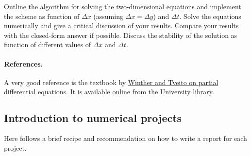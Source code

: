 \documentclass[%
oneside,                 %
final,                   %
10pt]{article}
\begin{document}
Outline the algorithm for solving the two-dimensional equations and
implement the scheme as function of $\Delta x$ (assuming $\Delta x =
\Delta y$) and $\Delta t$. Solve the equations numerically and give a
critical discussion of your results. Compare your results with the
closed-form answer if possible. Discuss the stability of the solution
as function of different values of $\Delta x$ and $\Delta t$.


\paragraph{References.}
A very good reference is the textbook by \href{{http://www.springer.com/us/book/9783540225515}}{Winther and Tveito on partial differential equations}. It is available online \href{{https://vpn2.uio.no/+CSCO+0h756767633A2F2F797661782E66636576617472652E70627A++/book/10.1007/b138016/page/1}}{from the University library}.


\subsection{Introduction to numerical projects}

Here follows a brief recipe and recommendation on how to write a report for each
project.
\end{document}
